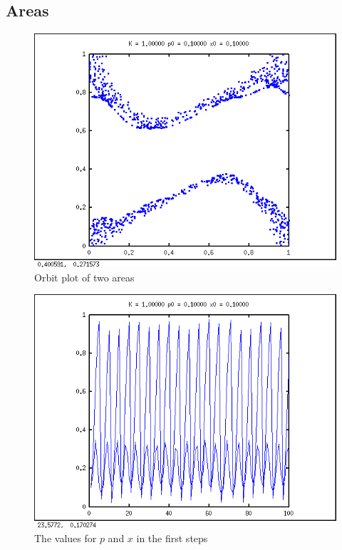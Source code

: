 \documentclass{article}
\begin{document}
\subsection*{Areas}

\begin{figure}[h!]
\centering
\includegraphics[width=\textwidth]{areaorbit.png}
\caption{Orbit plot of two areas}
\label{areaorbit}
\end{figure}
\begin{figure}[h!]
\centering
\includegraphics[width=\textwidth]{areavalues.png}
\caption{The values for $p$ and $x$ in the first steps }
\label{areaval}
\end{figure}
\end{document}
